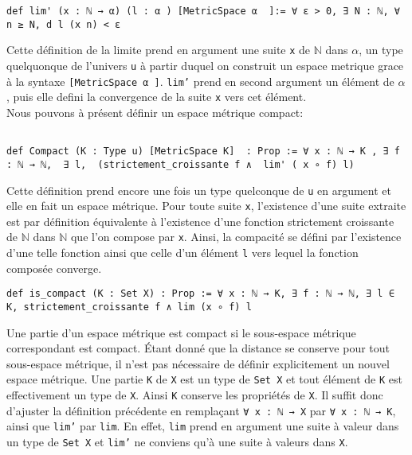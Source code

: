 \documentclass[a4paper, 12pt]{article}
\newcommand{\lean}[1]{\texttt{#1}}
\begin{document}
\vspace{\baselineskip} 
\vspace{\baselineskip} 
 
\begin{verbatim}
def lim' (x : ℕ → α) (l : α ) [MetricSpace α  ]:= ∀ ε > 0, ∃ N : ℕ, ∀ n ≥ N, d l (x n) < ε
\end{verbatim}

Cette définition de la limite prend en argument une suite \lean{x} de $\mathbb{N}$ dans $\alpha$, un type quelquonque de l'univers \lean{u} à partir duquel on construit un espace metrique grace à la syntaxe \lean{[MetricSpace α  ]}. \lean{lim'} prend en second argument un élément de $\alpha$, puis elle defini la convergence de la suite \lean{x} vers cet élément.\\

Nous pouvons à présent définir un espace métrique compact:

\begin{verbatim}

def Compact (K : Type u) [MetricSpace K]  : Prop := ∀ x : ℕ → K , ∃ f : ℕ → ℕ,  ∃ l,  (strictement_croissante f ∧  lim' ( x ∘ f) l)
\end{verbatim}

Cette définition prend encore une fois un type quelconque  de \lean{u} en argument et elle en fait un espace métrique. Pour toute suite \lean{x}, l'existence d'une suite extraite est par définition équivalente à l'existence d'une fonction strictement croissante de $\mathbb{N} $ dans $\mathbb{N} $  que l'on compose par \lean{x}. Ainsi, la compacité se défini  par l'existence d'une telle fonction ainsi que celle d'un élément  \lean{l} vers lequel la fonction composée converge.

\begin{verbatim}
def is_compact (K : Set X) : Prop := ∀ x : ℕ → K, ∃ f : ℕ → ℕ, ∃ l ∈ K, strictement_croissante f ∧ lim (x ∘ f) l

\end{verbatim}

Une partie d'un espace métrique est compact si le sous-espace métrique correspondant est compact. Étant donné que la distance se conserve pour tout sous-espace métrique, il n'est pas nécessaire de définir explicitement un nouvel espace métrique. Une partie \lean{K} de \lean{X} est un type de \lean{Set X} et tout élément de  \lean{K} est effectivement un type de \lean{X}. Ainsi  \lean{K} conserve les propriétés de \lean{X}. Il suffit donc d'ajuster la définition précédente en remplaçant \lean{∀ x : ℕ → X} par \lean{∀ x : ℕ → K}, ainsi que \lean{lim'} par \lean{lim}. En effet, \lean{lim} prend en argument une suite à valeur dans un type de \lean{Set X} et \lean{lim'} ne conviens qu'à une suite à valeurs dans \lean{X}.
\end{document}
